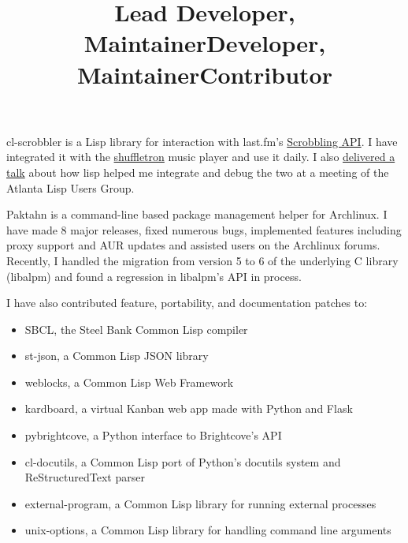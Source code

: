 \documentclass[margintitle,line]{res}
\begin{document}
\begin{resume}
\title{Lead Developer, Maintainer}
\begin{position}
  cl-scrobbler is a Lisp library for interaction with last.fm's
  \href{http://www.last.fm/api/scrobbling}{Scrobbling API}. I have integrated
  it with the \href{http://vintage-digital.com/hefner/software/shuffletron/}{shuffletron}
  music player and use it daily. I also
  \href{http://redlinernotes.com/docs/talks/cl-mft.html}{delivered a talk}
  about how lisp helped me integrate and debug the two at a meeting of the
  Atlanta Lisp Users Group.
\end{position}

\title{Developer, Maintainer}
\begin{position}
  Paktahn is a command-line based package management helper for Archlinux.
  I have made 8 major releases, fixed numerous bugs, implemented features
  including proxy support and AUR updates and assisted users on the Archlinux
  forums. Recently, I handled the migration from version 5 to 6 of the
  underlying C library (libalpm) and found a regression in libalpm's API in
  process.
\end{position}

\title{Contributor}
\begin{position}
  I have also contributed feature, portability, and documentation patches to:
  \begin{itemize}
    \item{SBCL, the Steel Bank Common Lisp compiler}
    \item{st-json, a Common Lisp JSON library}
    \item{weblocks, a Common Lisp Web Framework}
    \item{kardboard, a virtual Kanban web app made with Python and Flask}
    \item{pybrightcove, a Python interface to Brightcove's API}
    \item{cl-docutils, a Common Lisp port of Python's docutils system and ReStructuredText parser}
    \item{external-program, a Common Lisp library for running external processes}
    \item{unix-options, a Common Lisp library for handling command line arguments}
  \end{itemize}
\end{position}


\end{resume}
\end{document}

